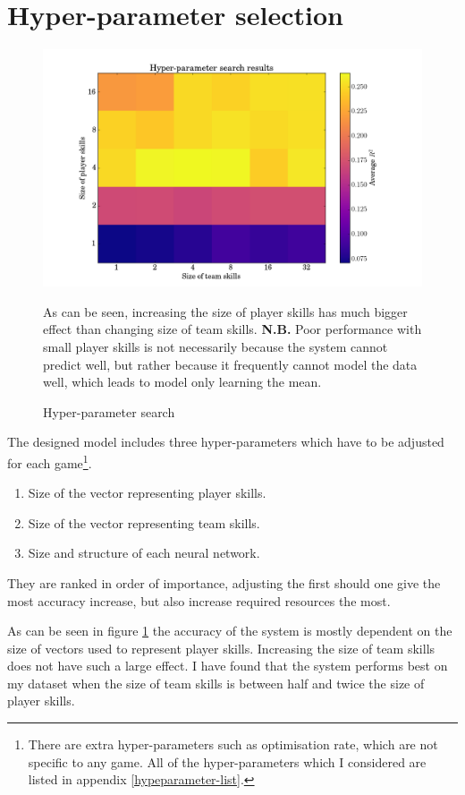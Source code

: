 \documentclass[12pt,a4paper]{book}
\newcommand\note[1]{\vspace*{-0.5\baselineskip}\caption*{#1}}
\begin{document}
\section{Hyper-parameter selection}
\begin{figure}[ht]
\centering
\includegraphics[scale=0.5]{hyper-parameter-search}
\caption{Hyper-parameter search}
\note{As can be seen, increasing the size of player skills has much bigger effect than changing size of team skills.
\textbf{N.B.} Poor performance with small player skills is not necessarily because the system cannot predict well, but rather because it frequently cannot model the data well, which leads to model only learning the mean.
}
\label{fig:hyper-parameter-search}
\end{figure}
The designed model includes three hyper-parameters which have to be adjusted for each game\footnote{There are extra hyper-parameters such as optimisation rate, which are not specific to any game. 
All of the hyper-parameters which I considered are listed in appendix  \ref{hypeparameter-list}.}.
\begin{enumerate}
\item Size of the vector representing player skills.
\item Size of the vector representing team skills.
\item Size and structure of each neural network.
\end{enumerate}
They are ranked in order of importance, adjusting the first should one give the most accuracy increase, but also increase required resources the most.

As can be seen in figure \ref{fig:hyper-parameter-search} the accuracy of the system is mostly dependent on the size of vectors used to represent player skills.
Increasing the size of team skills does not have such a large effect.
I have found that the system performs best on my dataset when the size of team skills is between half and twice the size of player skills.
\end{document}
